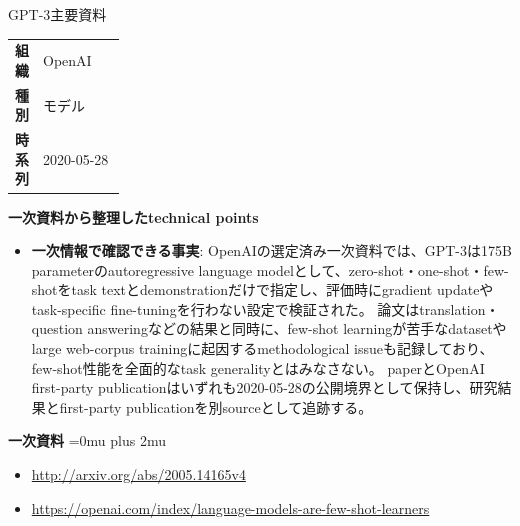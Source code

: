 \begin{technicalnote}{GPT-3}{主要資料}
\begingroup
\begin{tabularx}{\linewidth}{@{}>{\bfseries}p{0.22\linewidth}X@{}}
組織 & OpenAI \\
種別 & モデル \\
時系列 & 2020-05-28 \\
\end{tabularx}
\smallskip
\begin{minipage}{\linewidth}
{\bfseries 一次資料から整理したtechnical points}
\begin{itemize}[leftmargin=1.5em,itemsep=0.35em]
\item \textbf{一次情報で確認できる事実}: OpenAIの選定済み一次資料では、GPT-3は175B parameterのautoregressive language modelとして、zero-shot・one-shot・few-shotをtask textとdemonstrationだけで指定し、評価時にgradient updateやtask-specific fine-tuningを行わない設定で検証された。 論文はtranslation・question answeringなどの結果と同時に、few-shot learningが苦手なdatasetやlarge web-corpus trainingに起因するmethodological issueも記録しており、few-shot性能を全面的なtask generalityとはみなさない。 paperとOpenAI first-party publicationはいずれも2020-05-28の公開境界として保持し、研究結果とfirst-party publicationを別sourceとして追跡する。
\end{itemize}
\begin{samepage}
{\bfseries 一次資料}
\begingroup\sloppy
\Urlmuskip=0mu plus 2mu\relax
\begin{itemize}[leftmargin=1.5em,itemsep=0.25em]
\item {\scriptsize\url{http://arxiv.org/abs/2005.14165v4}}
\item {\scriptsize\url{https://openai.com/index/language-models-are-few-shot-learners}}
\end{itemize}
\endgroup
\end{samepage}
\end{minipage}
\endgroup
\end{technicalnote}
\medskip
